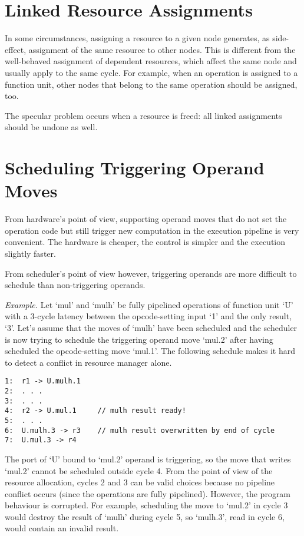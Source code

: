 \documentclass[a4paper,twoside]{tce}
\begin{document}
\section{Linked Resource Assignments}
\label{ch:pending:linked-assignments}

In some circumstances, assigning a resource to a given node generates, as
side-effect, assignment of the same resource to other nodes. This is
different from the well-behaved assignment of dependent resources, which
affect the same node and usually apply to the same cycle. For example, when
an operation is assigned to a function unit, other nodes that belong to the
same operation should be assigned, too.

The specular problem occurs when a resource is freed: all linked assignments
should be undone as well.

\section{Scheduling Triggering Operand Moves}
\label{ch:pending:triggering-operands}

From hardware's point of view, supporting operand moves that do not set the
operation code but still trigger new computation in the execution pipeline
is very convenient. The hardware is cheaper, the control is simpler and the
execution slightly faster.

From scheduler's point of view however, triggering operands are more
difficult to schedule than non-triggering operands.

\emph{Example.}
%
Let `mul' and `mulh' be fully pipelined operations of function unit `U' with
a 3-cycle latency between the opcode-setting input `1' and the only result,
`3'. Let's assume that the moves of `mulh' have been scheduled and the
scheduler is now trying to schedule the triggering operand move `mul.2'
after having scheduled the opcode-setting move `mul.1'. The following
schedule makes it hard to detect a conflict in resource manager alone.
\begin{verbatim}
1:  r1 -> U.mulh.1
2:  . . .
3:  . . .
4:  r2 -> U.mul.1     // mulh result ready!
5:  . . .
6:  U.mulh.3 -> r3    // mulh result overwritten by end of cycle
7:  U.mul.3 -> r4
\end{verbatim}
%
The port of `U' bound to `mul.2' operand is triggering, so the move that
writes `mul.2' cannot be scheduled outside cycle 4. From the point of view
of the resource allocation, cycles 2 and 3 can be valid choices because no
pipeline conflict occurs (since the operations are fully pipelined).
However, the program behaviour is corrupted. For example, scheduling the
move to `mul.2' in cycle 3 would destroy the result of `mulh' during cycle
5, so `mulh.3', read in cycle 6, would contain an invalid result.
\end{document}
